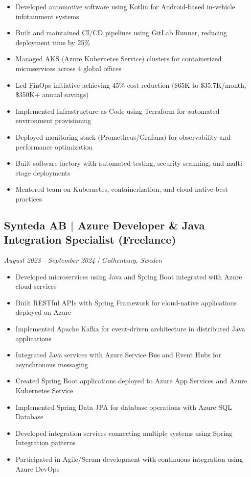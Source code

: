 \documentclass[11pt,a4paper]{article}
\begin{document}
\begin{itemize}[leftmargin=*, itemsep=2pt]
\item Developed automotive software using Kotlin for Android-based in-vehicle infotainment systems
\item Built and maintained CI/CD pipelines using GitLab Runner, reducing deployment time by 25\%
\item Managed AKS (Azure Kubernetes Service) clusters for containerized microservices across 4 global offices
\item Led FinOps initiative achieving 45\% cost reduction (\$65K to \$35.7K/month, \$350K+ annual savings)
\item Implemented Infrastructure as Code using Terraform for automated environment provisioning
\item Deployed monitoring stack (Prometheus/Grafana) for observability and performance optimization
\item Built software factory with automated testing, security scanning, and multi-stage deployments
\item Mentored team on Kubernetes, containerization, and cloud-native best practices
\end{itemize}

\subsection*{Synteda AB | Azure Developer \& Java Integration Specialist (Freelance)}
\textit{August 2023 - September 2024 | Gothenburg, Sweden}

\begin{itemize}[leftmargin=*, itemsep=2pt]
\item Developed microservices using Java and Spring Boot integrated with Azure cloud services
\item Built RESTful APIs with Spring Framework for cloud-native applications deployed on Azure
\item Implemented Apache Kafka for event-driven architecture in distributed Java applications
\item Integrated Java services with Azure Service Bus and Event Hubs for asynchronous messaging
\item Created Spring Boot applications deployed to Azure App Services and Azure Kubernetes Service
\item Implemented Spring Data JPA for database operations with Azure SQL Database
\item Developed integration services connecting multiple systems using Spring Integration patterns
\item Participated in Agile/Scrum development with continuous integration using Azure DevOps
\end{itemize}
\end{document}
